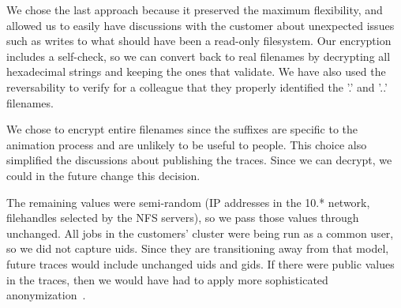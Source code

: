 We chose the last approach because it preserved the maximum
flexibility, and allowed us to easily have discussions with the
customer about unexpected issues such as writes to what should have
been a read-only filesystem.  Our encryption includes a self-check, so
we can convert back to real filenames by decrypting all hexadecimal
strings and keeping the ones that validate.  We have also used the
reversability to verify for a colleague that they properly identified
the '.' and '..' filenames.

We chose to encrypt entire filenames since the suffixes are specific
to the animation process and are unlikely to be useful to people.
This choice also simplified the discussions about publishing the
traces.  Since we can decrypt, we could in the future change this
decision.

The remaining values were semi-random (IP addresses in the 10.*
network, filehandles selected by the NFS servers), so we pass those values
through unchanged.  All jobs in the customers' cluster were being run
as a common user, so we did not capture uids.  Since they are
transitioning away from that model, future traces would include
unchanged uids and gids.  If there were public values in the traces,
then we would have had to apply more sophisticated
anonymization~\cite{ruoming07anonymization}.



